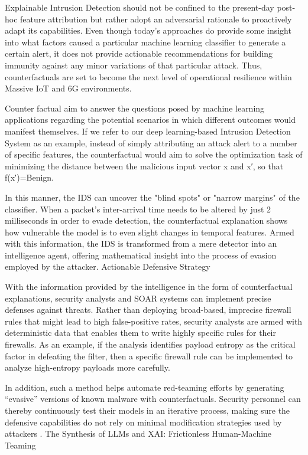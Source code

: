 \documentclass[12pt]{article}
\begin{document}
    Explainable Intrusion Detection should not be confined to the present-day post-hoc feature attribution but rather adopt an adversarial rationale to proactively adapt its capabilities. Even though today’s approaches do provide some insight into what factors caused a particular machine learning classifier to generate a certain alert, it does not provide actionable recommendations for building immunity against any minor variations of that particular attack. Thus, counterfactuals are set to become the next level of operational resilience within Massive IoT and 6G environments.

Counter factual aim to answer the questions posed by machine learning applications regarding the potential scenarios in which different outcomes would manifest themselves. If we refer to our deep learning-based Intrusion Detection System as an example, instead of simply attributing an attack alert to a number of specific features, the counterfactual would aim to solve the optimization task of minimizing the distance between the malicious input vector x and x′, so that f(x′)=Benign.

In this manner, the IDS can uncover the "blind spots" or "narrow margins" of the classifier. When a packet's inter-arrival time needs to be altered by just 2 milliseconds in order to evade detection, the counterfactual explanation shows how vulnerable the model is to even slight changes in temporal features. Armed with this information, the IDS is transformed from a mere detector into an intelligence agent, offering mathematical insight into the process of evasion employed by the attacker.
Actionable Defensive Strategy

With the information provided by the intelligence in the form of counterfactual explanations, security analysts and SOAR systems can implement precise defenses against threats. Rather than deploying broad-based, imprecise firewall rules that might lead to high false-positive rates, security analysts are armed with deterministic data that enables them to write highly specific rules for their firewalls. As an example, if the analysis identifies payload entropy as the critical factor in defeating the filter, then a specific firewall rule can be implemented to analyze high-entropy payloads more carefully.

In addition, such a method helps automate red-teaming efforts by generating “evasive” versions of known malware with counterfactuals. Security personnel can thereby continuously test their models in an iterative process, making sure the defensive capabilities do not rely on minimal modification strategies used by attackers \cite{frontiers2025ids}.
The Synthesis of LLMs and XAI: Frictionless Human-Machine Teaming
\end{document}
